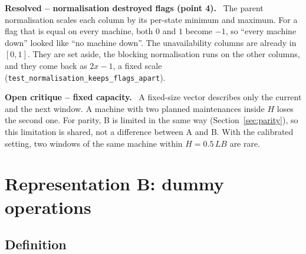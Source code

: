 \documentclass[11pt,a4paper]{article}
\newenvironment{critique}[1]{%
  \par\medskip\noindent\textbf{\color{critic}Open critique -- #1.}\ }{\par\medskip}
\newenvironment{resolved}[1]{%
  \par\medskip\noindent\textbf{\color{resolved}Resolved -- #1.}\ }{\par\medskip}
\newcommand{\code}[1]{\texttt{#1}}
\begin{document}
\begin{resolved}{normalisation destroyed flags (point 4)}
The parent normalisation scales each column by its per-state minimum and maximum. For a flag
that is equal on every machine, both $0$ and $1$ become $-1$, so ``every machine down'' looked
like ``no machine down''. The unavailability columns are already in $[0,1]$. They are set
aside, the blocking normalisation runs on the other columns, and they come back as $2x-1$, a
fixed scale (\code{test\_normalisation\_keeps\_flags\_apart}).
\end{resolved}

\begin{critique}{fixed capacity}
A fixed-size vector describes only the current and the next window. A machine with two planned
maintenances inside $H$ loses the second one. For parity, B is limited in the same way
(Section~\ref{sec:parity}), so this limitation is shared, not a difference between A and B.
With the calibrated setting, two windows of the same machine within $H=0.5\,LB$ are rare.
\end{critique}

\section{Representation B: dummy operations}

\subsection{Definition}
\end{document}
